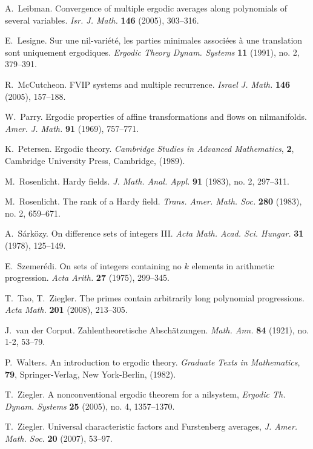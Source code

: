 \documentclass[11pt]{amsart}
\theoremstyle{plain}
\theoremstyle{definition}
\theoremstyle{remark}
\begin{document}
\begin{thebibliography}{9999}
 A.~Leibman.  Convergence of multiple ergodic
  averages along polynomials of several variables.  {\it Isr. J.
    Math.} \textbf{146} (2005), 303--316.


 E.~Lesigne. Sur une nil-vari\'et\'e, les parties
  minimales associ\'ees \`a une translation sont uniquement
  ergodiques.  {\it Ergodic Theory Dynam. Systems} \textbf{11}
  (1991), no. 2, 379--391.


 R.~McCutcheon. FVIP systems and multiple recurrence.
  {\em Israel J. Math.} {\bf 146} (2005), 157--188.


 W.~Parry. Ergodic properties of affine
  transformations and flows on nilmanifolds. {\it Amer. J. Math.}
  \textbf{91} (1969), 757--771.

 K.~Petersen. Ergodic theory.  {\em Cambridge Studies
    in Advanced Mathematics}, \textbf{2}, Cambridge University Press,
  Cambridge, (1989).

 M.~Rosenlicht. Hardy fields. {\em J. Math. Anal.
    Appl.} \textbf{91} (1983), no. 2, 297--311.

 M.~Rosenlicht. The rank of a Hardy field.  {\em
    Trans. Amer. Math. Soc.} \textbf{280} (1983), no. 2, 659--671.

 A.~S\'ark\"ozy. On difference sets of integers III.
  {\it Acta Math. Acad. Sci. Hungar.} {\bf 31} (1978), 125--149.


 E.~Szemer\'edi.  On sets of integers containing no
  $k$ elements in arithmetic progression. {\it Acta Arith.} {\bf 27}
  (1975), 299--345.

 T.~Tao, T.~Ziegler. The primes contain arbitrarily long polynomial progressions.
 {\em Acta Math.} \textbf{201} (2008), 213--305.

 J.~van der Corput. Zahlentheoretische
  Absch\"atzungen.  {\em Math. Ann.} \textbf{84} (1921), no. 1-2,
  53--79.

 P.~Walters. An introduction to ergodic theory. {\it
    Graduate Texts in Mathematics}, \textbf{79}, Springer-Verlag, New
  York-Berlin, (1982).



 T.~Ziegler.
A nonconventional ergodic theorem for a nilsystem, {\em Ergodic
Th. Dynam. Systems} \textbf{25} (2005), no. 4, 1357--1370.


 T.~Ziegler.  Universal characteristic factors and
  Furstenberg averages, {\it J. Amer. Math. Soc.} \textbf{20}
  (2007), 53--97.



\end{thebibliography}
\end{document}
